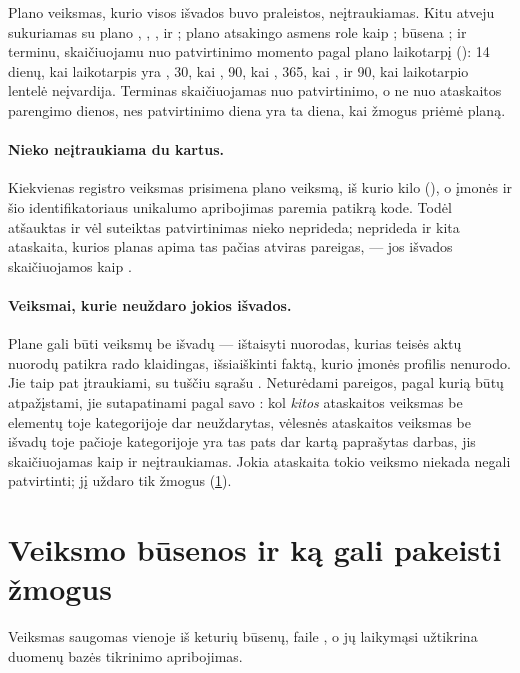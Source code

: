 Plano veiksmas, kurio visos išvados buvo praleistos, neįtraukiamas. Kitu atveju sukuriamas
 su plano , , ,
 ir ; plano atsakingo asmens role kaip ; būsena
; ir terminu, skaičiuojamu nuo patvirtinimo momento pagal plano laikotarpį
(): 14 dienų, kai laikotarpis yra , 30, kai , 90,
kai , 365, kai , ir 90, kai laikotarpio lentelė neįvardija. Terminas
skaičiuojamas nuo patvirtinimo, o ne nuo ataskaitos parengimo dienos, nes patvirtinimo diena yra
ta diena, kai žmogus priėmė planą.

\paragraph{Nieko neįtraukiama du kartus.} Kiekvienas registro veiksmas prisimena plano veiksmą,
iš kurio kilo (), o įmonės ir šio identifikatoriaus unikalumo
apribojimas paremia patikrą kode. Todėl atšauktas ir vėl suteiktas patvirtinimas nieko neprideda; neprideda
ir kita ataskaita, kurios planas apima tas pačias atviras pareigas, --- jos išvados
skaičiuojamos kaip .

\paragraph{Veiksmai, kurie neuždaro jokios išvados.} Plane gali būti veiksmų be išvadų ---
ištaisyti nuorodas, kurias teisės aktų nuorodų patikra rado klaidingas, išsiaiškinti faktą,
kurio įmonės profilis nenurodo. Jie taip pat įtraukiami, su tuščiu sąrašu . Neturėdami
pareigos, pagal kurią būtų atpažįstami, jie sutapatinami pagal savo : kol
\emph{kitos} ataskaitos veiksmas be elementų toje kategorijoje dar neuždarytas, vėlesnės ataskaitos
veiksmas be išvadų toje pačioje kategorijoje yra tas pats dar kartą paprašytas darbas, jis
skaičiuojamas kaip  ir neįtraukiamas. Jokia ataskaita tokio veiksmo niekada negali
patvirtinti; jį uždaro tik žmogus (\cref{sec:register:states}).


\section{Veiksmo būsenos ir ką gali pakeisti žmogus}\label{sec:register:states}

Veiksmas saugomas vienoje iš keturių būsenų,  faile
, o jų laikymąsi užtikrina duomenų bazės tikrinimo apribojimas.

